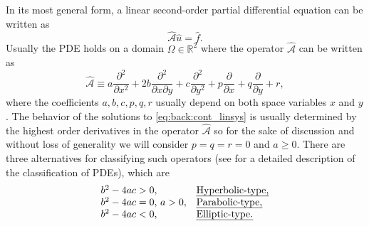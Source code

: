 In its most general form, a linear second-order partial differential equation
can be written as
%
\begin{equation}\label{eq:back:cont_linsys}
\hat{\mathscr{A}}\hat{u}=\hat{f}.
\end{equation}
%
Usually the PDE holds on a domain $\Omega\in\mathbb{R}^2$ where the operator  $\hat{\mathscr{A}}$ can be written as
%
\begin{equation}\label{eq:back:cont_oper}
\hat{\mathscr{A}}\equiv a \frac{\partial^2 }{\partial x^2} + 2b \frac{\partial^2 }{\partial x\partial y} + c \frac{\partial^2 }{\partial y^2} + p\frac{\partial }{\partial x} + q \frac{\partial }{\partial y} + r,
\end{equation}
%
where the coefficients $a,b,c,p,q,r$ usually depend on both space variables $x$ and $y$. The behavior of the solutions to \eqref{eq:back:cont_linsys}
is usually determined by the highest order derivatives in the operator $\hat{\mathscr{A}}$ so for the sake of discussion and without loss
of generality we will consider $p=q=r=0$  and $a\geq0$. There are three
alternatives for classifying such operators (see \cite{ElmSilWat14, Eva10} for a detailed description of the classification of PDEs), which are
%
\begin{equation}\label{eq:back:PDEclass}
\begin{array}{ll}
b^2-4ac>0, & \text{\emph{Hyperbolic-type,}}\\
b^2-4ac=0,\,a>0, & \text{\emph{Parabolic-type,}}\\
b^2-4ac<0, & \text{\emph{Elliptic-type.}}\\
\end{array}
\end{equation}


